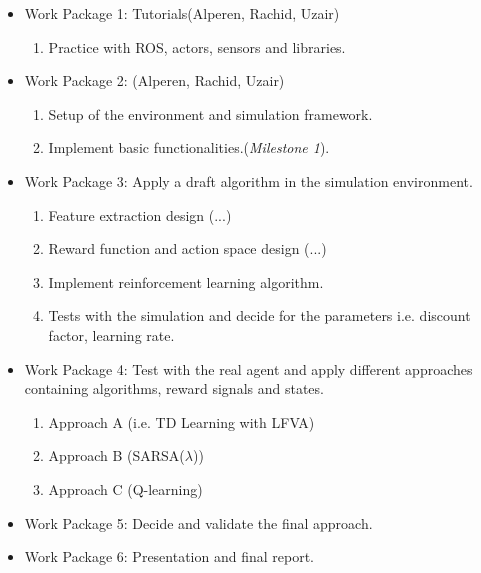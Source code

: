 \documentclass[12pt,a4paper]{article}
\begin{document}
\begin{itemize}
\item Work Package 1: Tutorials(Alperen, Rachid, Uzair)

	\begin{enumerate}
	\item Practice with ROS, actors, sensors and libraries.
	\end{enumerate}
	
\item Work Package 2: (Alperen, Rachid, Uzair)
	\begin{enumerate}
	\item  Setup of the environment and simulation framework.
	\item Implement basic functionalities.(\textit{Milestone 1}).
	\end{enumerate}
	
\item Work Package 3: Apply a draft algorithm in the simulation environment.
	\begin{enumerate}
	\item Feature extraction design (...)
	\item Reward function and  action space  design (...)
	\item Implement reinforcement learning algorithm.
	\item Tests with the simulation and decide for the parameters i.e. discount factor, learning rate.
	\end{enumerate}
	
\item Work Package 4: Test with the real agent and apply different approaches containing algorithms, reward signals and states.
	\begin{enumerate}
	\item Approach A (i.e. TD Learning with LFVA)
	\item Approach B (SARSA($\lambda$))
	\item Approach C (Q-learning)
	\end{enumerate}
	
\item Work Package 5:  Decide and validate the final approach.

\item Work Package 6: Presentation and final report.


\end{itemize}












\end{document}
